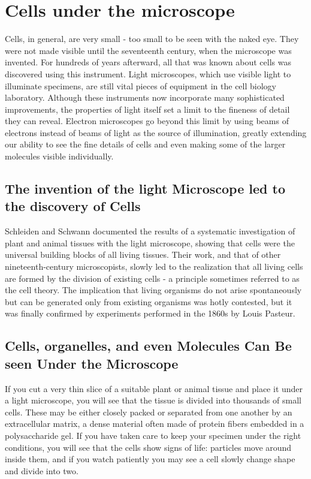 \section{Cells under the microscope}

Cells, in general, are very small - too small to be seen with the naked
eye. They were not made visible until the seventeenth century, when the
microscope was invented. For hundreds of years afterward, all that was
known about cells was discovered using this instrument. Light microscopes,
which use visible light to illuminate specimens, are still vital
pieces of equipment in the cell biology laboratory.
Although these instruments now incorporate many sophisticated
improvements, the properties of light itself set a limit to the fineness of
detail they can reveal. Electron microscopes go
beyond this limit by using beams of electrons instead of beams of light
as the source of illumination, greatly extending our ability to see the fine
details of cells and even making some of the larger molecules visible
individually.

\subsection{The invention of the light Microscope led to the discovery of Cells}

Schleiden and Schwann documented the results
of a systematic investigation of plant and animal tissues with the light
microscope, showing that cells were the universal building blocks of all
living tissues. Their work, and that of other nineteenth-century microscopists,
slowly led to the realization that all living cells are formed by
the division of existing cells - a principle sometimes referred to as the
cell theory. The implication that living organisms do not arise
spontaneously but can be generated only from existing organisms was
hotly contested, but it was finally confirmed by experiments performed in
the 1860s by Louis Pasteur.

\subsection{Cells, organelles, and even Molecules Can Be seen Under the Microscope}

If you cut a very thin slice of a suitable plant or animal tissue and place
it under a light microscope, you will see that the tissue is divided into
thousands of small cells. These may be either closely packed or separated
from one another by an extracellular matrix, a dense material often made
of protein fibers embedded in a polysaccharide gel.
If you have taken care
to keep your specimen under the right conditions, you will see that the
cells show signs of life: particles move around inside them, and if you
watch patiently you may see a cell slowly change shape and divide into
two.

